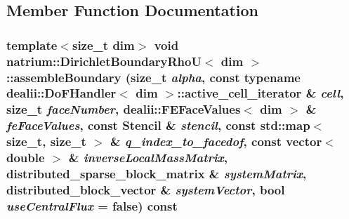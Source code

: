 \subsection{Member Function Documentation}
\hypertarget{classnatrium_1_1DirichletBoundaryRhoU_a9fecb00df16c4294d9852222ddbdb4ca}{
\subsubsection[{assembleBoundary}]{\setlength{\rightskip}{0pt plus 5cm}template$<$size\_\-t dim$>$ void {\bf natrium::DirichletBoundaryRhoU}$<$ dim $>$::assembleBoundary (size\_\-t {\em alpha}, \/  const typename dealii::DoFHandler$<$ dim $>$::active\_\-cell\_\-iterator \& {\em cell}, \/  size\_\-t {\em faceNumber}, \/  dealii::FEFaceValues$<$ dim $>$ \& {\em feFaceValues}, \/  const {\bf Stencil} \& {\em stencil}, \/  const std::map$<$ size\_\-t, size\_\-t $>$ \& {\em q\_\-index\_\-to\_\-facedof}, \/  const vector$<$ double $>$ \& {\em inverseLocalMassMatrix}, \/  distributed\_\-sparse\_\-block\_\-matrix \& {\em systemMatrix}, \/  distributed\_\-block\_\-vector \& {\em systemVector}, \/  bool {\em useCentralFlux} = {\ttfamily false}) const}}
\label{classnatrium_1_1DirichletBoundaryRhoU_a9fecb00df16c4294d9852222ddbdb4ca}


